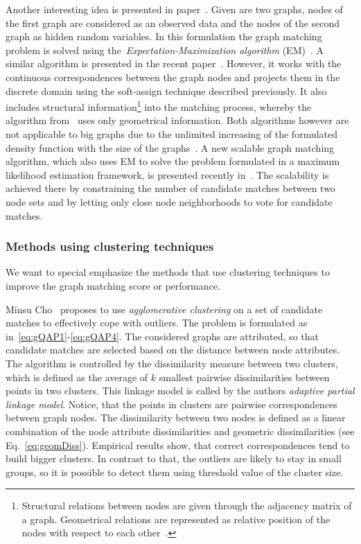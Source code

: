 Another interesting idea is presented in paper~\cite{Hancock_EM_SVD}. Given are two graphs, nodes of the first graph are considered as an observed data and the nodes of the second graph as hidden random variables. In this formulation the graph matching problem is solved using the~\emph{Expectation-Maximization algorithm} (EM)~\cite{EM_Dempster1977}. A similar algorithm is presented in the recent paper~\cite{Sanrom2012}. However, it works with the continuous correspondences between the graph nodes and projects them in the discrete domain using the soft-assign technique described previously. It also includes structural information\footnote{Structural relations between nodes are given through the adjacency matrix of a graph. Geometrical relations are represented as relative position of the nodes with respect to each other~\cite{Sanrom2012}.} into the matching process, whereby the algorithm from~\cite{Hancock_EM_SVD} uses only geometrical information. Both algorithms however are not applicable to big graphs due to the unlimited increasing of the formulated density function with the size of the graphs~\cite{Armiti2014}. A new scalable graph matching algorithm, which also uses EM to solve the problem formulated in a maximum likelihood estimation framework, is presented recently in~\cite{Armiti2014}. The scalability is achieved there by constraining the number of candidate matches between two node sets and by letting only close node neighborhoods to vote for candidate matches.
\subsubsection{Methods using clustering techniques}
We want to special emphasize the methods that use clustering techniques to improve the graph matching score or performance.

Minsu Cho~\cite{Cho2009_AgglClustering} proposes to use \emph{agglomerative clustering} on a set of candidate matches to effectively cope with outliers. The problem is formulated as in~\eqref{eq:gQAP1}-\eqref{eq:gQAP4}. The considered graphs are attributed, so that candidate matches are selected based on the distance between node attributes. The algorithm is controlled by the dissimilarity measure between two clusters, which is defined as the average of $k$ smallest pairwise dissimilarities between points in two clusters. This linkage model is called by the authors \emph{adaptive partial linkage model}. Notice, that the points in clusters are pairwise correspondences between graph nodes. The dissimilarity between two nodes is defined as a linear combination of the node attribute dissimilarities and 
geometric dissimilarities (see Eq.~\eqref{eq:geomDiss}). Empirical results show, that correct correspondences tend to build bigger clusters. In contrast to that, the outliers are likely to stay in small groups, so it is possible to detect them using threshold value of the cluster size.

